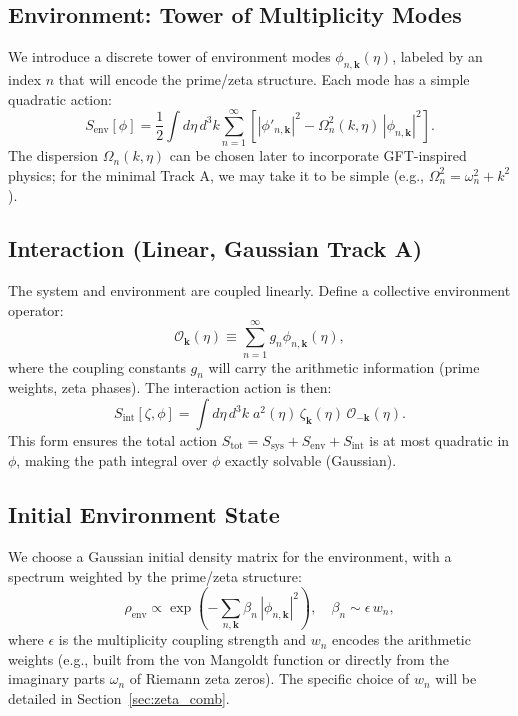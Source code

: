 \documentclass[12pt]{article}
\begin{document}
\subsection{Environment: Tower of Multiplicity Modes}
We introduce a discrete tower of environment modes $\phi_{n,\bm{k}}(\eta)$, labeled by an index $n$ that will encode the prime/zeta structure. Each mode has a simple quadratic action:
\begin{equation}
S_{\text{env}}[\phi] = \frac{1}{2}\int d\eta \, d^3k \sum_{n=1}^{\infty} \left[|\phi'_{n,\bm{k}}|^2 - \Omega_n^2(k,\eta)\,|\phi_{n,\bm{k}}|^2\right].
\label{eq:env_action}
\end{equation}
The dispersion $\Omega_n(k,\eta)$ can be chosen later to incorporate GFT-inspired physics; for the minimal Track A, we may take it to be simple (e.g., $\Omega_n^2 = \omega_n^2 + k^2$).

\subsection{Interaction (Linear, Gaussian Track A)}
The system and environment are coupled linearly. Define a collective environment operator:
\begin{equation}
\mathcal{O}_{\bm{k}}(\eta) \equiv \sum_{n=1}^{\infty} g_n \phi_{n,\bm{k}}(\eta),
\end{equation}
where the coupling constants $g_n$ will carry the arithmetic information (prime weights, zeta phases). The interaction action is then:
\begin{equation}
S_{\text{int}}[\zeta,\phi] = \int d\eta\, d^3k \; a^2(\eta)\, \zeta_{\bm{k}}(\eta)\, \mathcal{O}_{-\bm{k}}(\eta).
\label{eq:int_action}
\end{equation}
This form ensures the total action $S_{\text{tot}} = S_{\text{sys}} + S_{\text{env}} + S_{\text{int}}$ is at most quadratic in $\phi$, making the path integral over $\phi$ exactly solvable (Gaussian).

\subsection{Initial Environment State}
We choose a Gaussian initial density matrix for the environment, with a spectrum weighted by the prime/zeta structure:
\begin{equation}
\rho_{\text{env}} \propto \exp\left(-\sum_{n,\bm{k}} \beta_n\, |\phi_{n,\bm{k}}|^2\right), \quad \beta_n \sim \epsilon \, w_n,
\label{eq:env_state}
\end{equation}
where $\epsilon$ is the multiplicity coupling strength and $w_n$ encodes the arithmetic weights (e.g., built from the von Mangoldt function or directly from the imaginary parts $\omega_n$ of Riemann zeta zeros). The specific choice of $w_n$ will be detailed in Section~\ref{sec:zeta_comb}.
\end{document}
